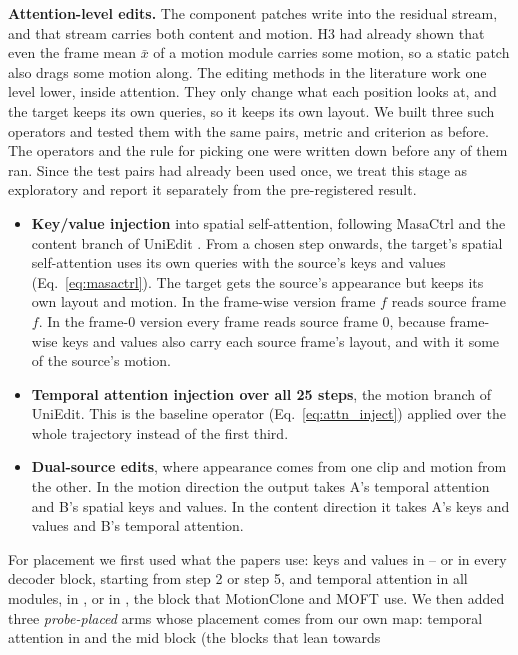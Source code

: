 \documentclass[twoside,english]{article}
\newcommand{\xs}{\bar{x}}         %
\begin{document}
\textbf{Attention-level edits.} The component patches write into the residual stream, and that stream
carries both content and motion. H3 had already shown that even the frame mean $\xs$ of a motion module
carries some motion, so a static patch also drags some motion along. The editing methods in the
literature work one level lower, inside attention. They only change what each position looks at, and
the target keeps its own queries, so it keeps its own layout. We built three such operators and tested
them with the same pairs, metric and criterion as before. The operators and the rule for picking one
were written down before any of them ran. Since the test pairs had already been used once, we treat this
stage as exploratory and report it separately from the pre-registered result.
\begin{itemize}
\item \textbf{Key/value injection} into spatial self-attention, following MasaCtrl \citep{cao2023masactrl}
  and the content branch of UniEdit \citep{bai2024uniedit}. From a chosen step onwards, the target's
  spatial self-attention uses its own queries with the source's keys and values
  (Eq.~\eqref{eq:masactrl}). The target gets the source's appearance but keeps its own layout and
  motion. In the frame-wise version frame $f$ reads source frame $f$. In the frame-0 version every frame
  reads source frame 0, because frame-wise keys and values also carry each source frame's layout, and
  with it some of the source's motion.
\item \textbf{Temporal attention injection over all 25 steps}, the motion branch of UniEdit. This is
  the baseline operator (Eq.~\eqref{eq:attn_inject}) applied over the whole trajectory instead of the
  first third.
\item \textbf{Dual-source edits}, where appearance comes from one clip and motion from the other. In the
  motion direction the output takes A's temporal attention and B's spatial keys and values. In the
  content direction it takes A's keys and values and B's temporal attention.
\end{itemize}
For placement we first used what the papers use: keys and values in -- or in
every decoder block, starting from step 2 or step 5, and temporal attention in all modules, in
, or in , the block that MotionClone \citep{ling2025motionclone} and
MOFT \citep{xiao2024moft} use. We then added three \emph{probe-placed} arms whose placement comes from
our own map: temporal attention in  and the mid block (the blocks that lean towards
\end{document}
